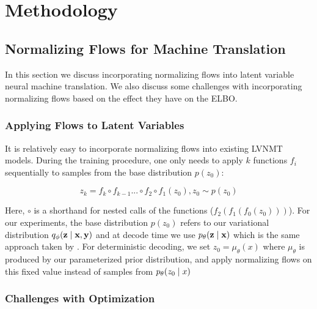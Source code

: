 \chapter{Methodology}


\section{Normalizing Flows for Machine Translation}

In this section we discuss incorporating normalizing flows into latent variable neural machine translation. We also discuss some challenges with incorporating normalizing flows based on the effect they have on the ELBO. 

\subsection{Applying Flows to Latent Variables}
It is relatively easy to incorporate normalizing flows into existing LVNMT models. During the training procedure, one only needs to apply $k$ functions $f_{i}$ sequentially to samples from the base distribution $p(z_{0})$: 

\begin{equation}
z_{k} = f_{k} \circ f_{k-1} ... \circ f_{2} \circ f_{1}(z_{0}) , z_{0} \sim p(z_{0})
\end{equation}

Here, $\circ$ is a shorthand for nested calls of the functions ($f_{2}(f_{1}(f_{0}(z_{0})))$). For our experiments, the base distribution $p(z_{0})$ refers to our variational distribution $q_{\phi}(\textbf{z} \; | \;{\textbf{x}, \textbf{y}})$ and at decode time we use $p_{\theta}(\textbf{z} \; | \;{\textbf{x}})$ which is the same approach taken by \citet{Zhang2016VNMT}. For deterministic decoding, we set $z_{0} = \mu_{\theta}(x)$ where $\mu_{\theta}$ is produced by our parameterized prior distribution, and apply normalizing flows on this fixed value instead of samples from $p_{\theta}(z_{0} \; | \;{x})$

\subsection{Challenges with Optimization}


